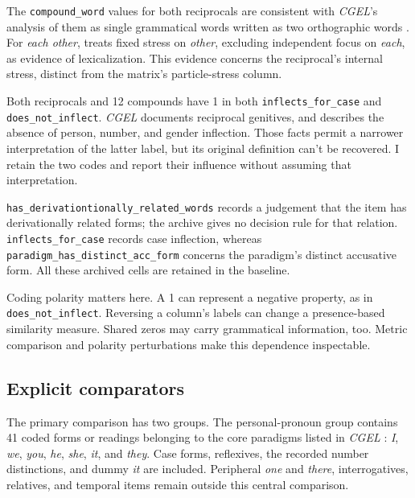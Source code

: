 \documentclass[12pt]{article}
\providecommand{\mention}[1]{\textit{#1}}
\begin{document}
The \texttt{compound\_word} values for both reciprocals are consistent with \textit{CGEL}'s analysis of them as single grammatical words written as two orthographic words \citep[Ch.~5, \S10.1.2]{huddleston2002}. For \mention{each other}, \textcite[42]{haas2007reciprocal} treats fixed stress on \mention{other}, excluding independent focus on \mention{each}, as evidence of lexicalization. This evidence concerns the reciprocal's internal stress, distinct from the matrix's particle-stress column.

Both reciprocals and 12 compounds have 1 in both \texttt{inflects\_for\_case} and \texttt{does\_not\_inflect}. \textit{CGEL} documents reciprocal genitives, and \textcite[48, n.~32]{haas2007reciprocal} describes the absence of person, number, and gender inflection. Those facts permit a narrower interpretation of the latter label, but its original definition can't be recovered. I retain the two codes and report their influence without assuming that interpretation.

\texttt{has\_\allowbreak derivationtionally\_\allowbreak related\_\allowbreak words} records a judgement that the item has derivationally related forms; the archive gives no decision rule for that relation. \texttt{inflects\_for\_case} records case inflection, whereas \texttt{paradigm\_\allowbreak has\_\allowbreak distinct\_\allowbreak acc\_\allowbreak form} concerns the paradigm's distinct accusative form. All these archived cells are retained in the baseline.

Coding polarity matters here. A 1 can represent a negative property, as in \texttt{does\_not\_inflect}. Reversing a column's labels can change a presence-based similarity measure. Shared zeros may carry grammatical information, too. Metric comparison and polarity perturbations make this dependence inspectable.

\subsection{Explicit comparators}

The primary comparison has two groups. The personal-pronoun group contains 41 coded forms or readings belonging to the core paradigms listed in \textit{CGEL} \citep[Ch.~5, \S10.1.1]{huddleston2002}: \mention{I}, \mention{we}, \mention{you}, \mention{he}, \mention{she}, \mention{it}, and \mention{they}. Case forms, reflexives, the recorded number distinctions, and dummy \mention{it} are included. Peripheral \mention{one} and \mention{there}, interrogatives, relatives, and temporal items remain outside this central comparison.
\end{document}
